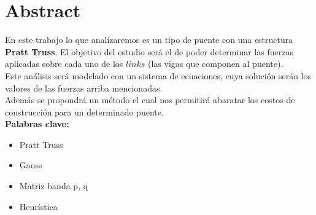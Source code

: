 \section{Abstract}

En este trabajo lo que analizaremos es un tipo de puente con una estructura {\bf Pratt Truss}. El objetivo del estudio será el de poder determinar las fuerzas aplicadas sobre cada uno de los $links$ (las vigas que componen al puente).\\

Este análisis será modelado con un sistema de ecuaciones, cuya solución serán los valores de las fuerzas arriba mencionadas.\\

Además se propondrá un método el cual nos permitirá abaratar los costos de construcción para un determinado puente.\\

{\bf Palabras clave:}
\begin{itemize}
    \item Pratt Truss
    \item Gauss
    \item Matriz banda p, q
    \item Heurística
\end{itemize}
